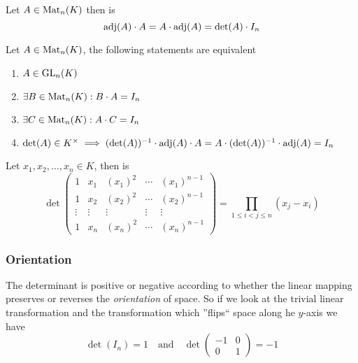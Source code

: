 \begin{corollary}\label{cor:adj}
   Let \(A \in \operatorname{Mat}_n(K)\) then is
   \[\operatorname{adj}(A) \cdot A = A \cdot \operatorname{adj}(A) = \det(A) \cdot I_n\]
\end{corollary}

\begin{corollary}
   Let \(A \in \operatorname{Mat}_n(K)\), the following statements are equivalent
   \begin{enumerate}[label=\roman*, align=Center]
      \item \(A \in \operatorname{GL}_n(K)\)
      \item \(\exists B \in \operatorname{Mat}_n(K): B \cdot A = I_n\)
      \item \(\exists C \in \operatorname{Mat}_n(K): A \cdot C = I_n\)
      \item \(\det(A) \in K^\times \implies (\det(A))^{-1} \cdot \operatorname{adj}(A) \cdot A = A \cdot (\det(A))^{-1} \cdot \operatorname{adj}(A) = I_n\)
   \end{enumerate}
\end{corollary}

\begin{proposition}
   Let \(x_1, x_2, \ldots, x_n \in K\), then is
   \[\det\begin{pmatrix}
         1 & x_1 & (x_1)^2 & \cdots & (x_1)^{n-1}\\
         1 & x_2 & (x_2)^2 & \cdots & (x_2)^{n-1}\\
         \vdots & \vdots & \vdots & \vdots & \vdots\\
         1 & x_n & (x_n)^2 & \cdots & (x_n)^{n-1}
   \end{pmatrix} = \prod_{1 \leq i < j \leq n} (x_j - x_i)\]
\end{proposition}

\subsubsection{Orientation}
The determinant is positive or negative according to whether the linear mapping preserves or reverses the \emph{orientation} of space.
So if we look at the trivial linear transformation and the transformation which ''flips`` space along he \(y\)-axis we have
\[\det(I_n) = 1 \quad\text{and}\quad \det\begin{pmatrix}-1&0\\0&1\end{pmatrix} = -1\]

\begin{figure}[h]
   \centering
   
   \qquad
   
\end{figure}

